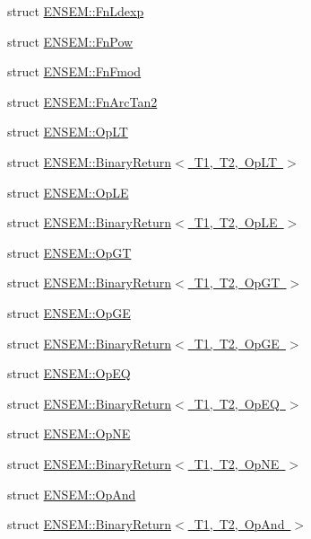 \begin{DoxyCompactItemize}
struct \mbox{\hyperlink{structENSEM_1_1FnLdexp}{E\+N\+S\+E\+M\+::\+Fn\+Ldexp}}
\item 
struct \mbox{\hyperlink{structENSEM_1_1FnPow}{E\+N\+S\+E\+M\+::\+Fn\+Pow}}
\item 
struct \mbox{\hyperlink{structENSEM_1_1FnFmod}{E\+N\+S\+E\+M\+::\+Fn\+Fmod}}
\item 
struct \mbox{\hyperlink{structENSEM_1_1FnArcTan2}{E\+N\+S\+E\+M\+::\+Fn\+Arc\+Tan2}}
\item 
struct \mbox{\hyperlink{structENSEM_1_1OpLT}{E\+N\+S\+E\+M\+::\+Op\+LT}}
\item 
struct \mbox{\hyperlink{structENSEM_1_1BinaryReturn_3_01T1_00_01T2_00_01OpLT_01_4}{E\+N\+S\+E\+M\+::\+Binary\+Return$<$ T1, T2, Op\+L\+T $>$}}
\item 
struct \mbox{\hyperlink{structENSEM_1_1OpLE}{E\+N\+S\+E\+M\+::\+Op\+LE}}
\item 
struct \mbox{\hyperlink{structENSEM_1_1BinaryReturn_3_01T1_00_01T2_00_01OpLE_01_4}{E\+N\+S\+E\+M\+::\+Binary\+Return$<$ T1, T2, Op\+L\+E $>$}}
\item 
struct \mbox{\hyperlink{structENSEM_1_1OpGT}{E\+N\+S\+E\+M\+::\+Op\+GT}}
\item 
struct \mbox{\hyperlink{structENSEM_1_1BinaryReturn_3_01T1_00_01T2_00_01OpGT_01_4}{E\+N\+S\+E\+M\+::\+Binary\+Return$<$ T1, T2, Op\+G\+T $>$}}
\item 
struct \mbox{\hyperlink{structENSEM_1_1OpGE}{E\+N\+S\+E\+M\+::\+Op\+GE}}
\item 
struct \mbox{\hyperlink{structENSEM_1_1BinaryReturn_3_01T1_00_01T2_00_01OpGE_01_4}{E\+N\+S\+E\+M\+::\+Binary\+Return$<$ T1, T2, Op\+G\+E $>$}}
\item 
struct \mbox{\hyperlink{structENSEM_1_1OpEQ}{E\+N\+S\+E\+M\+::\+Op\+EQ}}
\item 
struct \mbox{\hyperlink{structENSEM_1_1BinaryReturn_3_01T1_00_01T2_00_01OpEQ_01_4}{E\+N\+S\+E\+M\+::\+Binary\+Return$<$ T1, T2, Op\+E\+Q $>$}}
\item 
struct \mbox{\hyperlink{structENSEM_1_1OpNE}{E\+N\+S\+E\+M\+::\+Op\+NE}}
\item 
struct \mbox{\hyperlink{structENSEM_1_1BinaryReturn_3_01T1_00_01T2_00_01OpNE_01_4}{E\+N\+S\+E\+M\+::\+Binary\+Return$<$ T1, T2, Op\+N\+E $>$}}
\item 
struct \mbox{\hyperlink{structENSEM_1_1OpAnd}{E\+N\+S\+E\+M\+::\+Op\+And}}
\item 
struct \mbox{\hyperlink{structENSEM_1_1BinaryReturn_3_01T1_00_01T2_00_01OpAnd_01_4}{E\+N\+S\+E\+M\+::\+Binary\+Return$<$ T1, T2, Op\+And $>$}}

\end{DoxyCompactItemize}
